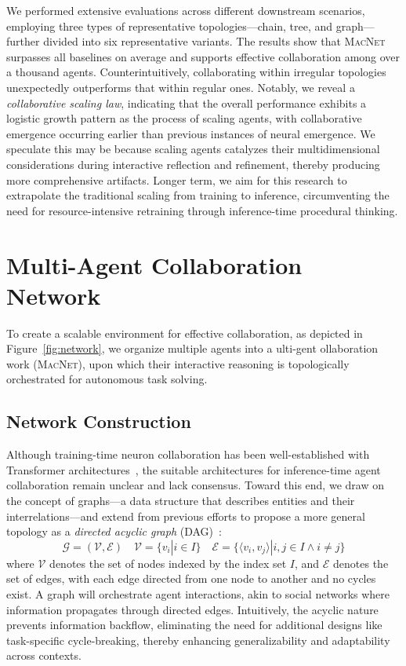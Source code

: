 \documentclass{article}
\begin{document}
We performed extensive evaluations across different downstream scenarios, employing three types of representative topologies—chain, tree, and graph—further divided into six representative variants.
The results show that \textsc{MacNet} surpasses all baselines on average and supports effective collaboration among over a thousand agents.
Counterintuitively, collaborating within irregular topologies unexpectedly outperforms that within regular ones.
Notably, we reveal a \textit{collaborative scaling law}, indicating that the overall performance exhibits a logistic growth pattern as the process of scaling agents, with collaborative emergence occurring earlier than previous instances of neural emergence.
We speculate this may be because scaling agents catalyzes their multidimensional considerations during interactive reflection and refinement, thereby producing more comprehensive artifacts.
Longer term, we aim for this research to extrapolate the traditional scaling from training to inference, circumventing the need for resource-intensive retraining through inference-time procedural thinking.


\section{Multi-Agent Collaboration Network}
To create a scalable environment for effective collaboration, as depicted in Figure~\ref{fig:network}, we organize multiple agents into a ulti-gent ollaboration work (\textsc{MacNet}), upon which their interactive reasoning is topologically orchestrated for autonomous task solving.


\subsection{Network Construction}
Although training-time neuron collaboration has been well-established with Transformer architectures~\citep{vaswani2017attention}, the suitable architectures for inference-time agent collaboration remain unclear and lack consensus.
Toward this end, we draw on the concept of graphs—a data structure that describes entities and their interrelations—and extend from previous efforts to propose a more general topology as a \textit{directed acyclic graph} (DAG)~\citep{Nilsson2020A}:
\begin{equation}
\mathcal{G} = (\mathcal{V}, \mathcal{E}) \quad
\mathcal{V}=\{ v_i | i \in I \} \quad \mathcal{E} = \{\langle v_i, v_j \rangle | i, j \in I \wedge i \neq j\}
\end{equation}
where \(\mathcal{V}\) denotes the set of nodes indexed by the index set \(I\), and \(\mathcal{E}\) denotes the set of edges, with each edge directed from one node to another and no cycles exist. 
A graph will orchestrate agent interactions, akin to social networks where information propagates through directed edges.
Intuitively, the acyclic nature prevents information backflow, eliminating the need for additional designs like task-specific cycle-breaking, thereby enhancing generalizability and adaptability across contexts.
\end{document}
